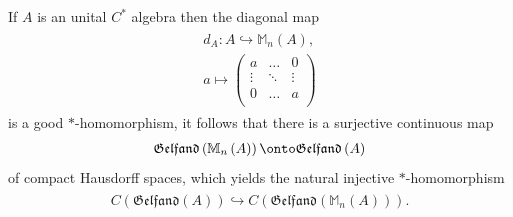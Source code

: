 \documentclass{beamer}
\theoremstyle{plain}
\newcommand{\bean}{\begin{eqnarray*}}
\newcommand{\eean}{\end{eqnarray*}}
\newcommand{\hookto}{\hookrightarrow}        %
\begin{document}
\begin{frame}

If $A$ is an unital $C^*$ algebra then the diagonal map 
\bean
	\begin{split}
		d_A : A \hookto \mathbb{M}_n\left(A \right) ,\\
		a \mapsto 		\begin{pmatrix}
			a& \ldots & 0  \\
			\vdots& \ddots & \vdots\\
			0& \ldots &a \\
		\end{pmatrix}
	\end{split}
	\eean
	is a good $*$-homomorphism, it follows that there is a surjective continuous map 
	\bean\label{ge_fc_eqn}
	\begin{split}
		\mathfrak{Gelfand}\left(\mathbb{M}_n\left(A \right)\right) \onto \mathfrak{Gelfand}\left(A \right)
	\end{split}
	\eean
	of compact Hausdorff  spaces, which yields the natural injective $*$-homomorphism
	\bean\label{fin_g_eqn}
	\begin{split}
		C\left( \mathfrak{Gelfand}\left(A \right)\right)  \hookto C\left( \mathfrak{Gelfand}\left(\mathbb{M}_n\left(A \right)\right) \right).
	\end{split}
	\eean
	
\end{frame}
\end{document}
